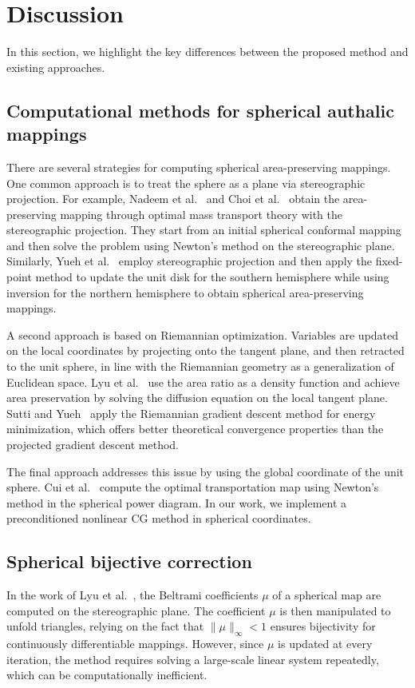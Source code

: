 \documentclass{article}
\numberwithin{equation}{section}
\begin{document}
\section{Discussion}
\label{sec:8}

In this section, we highlight the key differences between the proposed method and existing approaches.

\subsection{Computational methods for spherical authalic mappings}
There are several strategies for computing spherical area-preserving mappings. One common approach is to treat the sphere as a plane via stereographic projection. For example, Nadeem et al.~\cite{NaSZ17} and Choi et al.~\cite{ChGK22} obtain the area-preserving mapping through optimal mass transport theory with the stereographic projection. They start from an initial spherical conformal mapping and then solve the problem using Newton's method on the stereographic plane. Similarly, Yueh et al.~\cite{YuLL19} employ stereographic projection and then apply the fixed-point method to update the unit disk for the southern hemisphere while using inversion for the northern hemisphere to obtain spherical area-preserving mappings.

A second approach is based on Riemannian optimization. Variables are updated on the local coordinates by projecting onto the tangent plane, and then retracted to the unit sphere, in line with the Riemannian geometry as a generalization of Euclidean space. Lyu et al.~\cite{LyZh24} use the area ratio as a density function and achieve area preservation by solving the diffusion equation on the local tangent plane. Sutti and Yueh~\cite{SuYu24} apply the Riemannian gradient descent method for energy minimization, which offers better theoretical convergence properties than the projected gradient descent method.

The final approach addresses this issue by using the global coordinate of the unit sphere. Cui et al.~\cite{CuQW19} compute the optimal transportation map using Newton's method in the spherical power diagram. In our work, we implement a preconditioned nonlinear CG method in spherical coordinates. 

\subsection{Spherical bijective correction}
{
In the work of Lyu et al.~\cite{LyZh24}, the Beltrami coefficients $\mu$ of a spherical map are computed on the stereographic plane. The coefficient $\mu$ is then manipulated to unfold triangles, relying on the fact that $\|\mu\|_\infty < 1$ ensures bijectivity for continuously differentiable mappings. However, since $\mu$ is updated at every iteration, the method requires solving a large-scale linear system repeatedly, which can be computationally inefficient.
}
\end{document}
